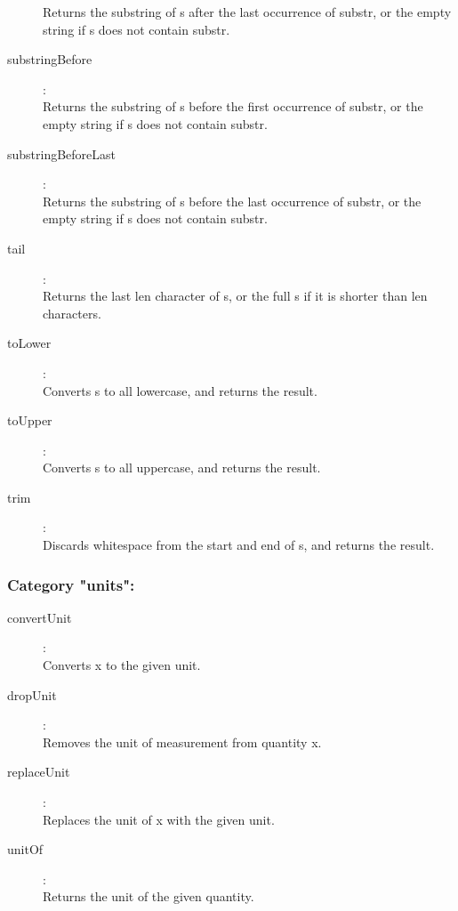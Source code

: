 \begin{description}
    Returns the substring of s after the last occurrence of substr, or the empty string if s does not contain substr.
\item[substringBefore]:  \\
    Returns the substring of s before the first occurrence of substr, or the empty string if s does not contain substr.
\item[substringBeforeLast]:  \\
    Returns the substring of s before the last occurrence of substr, or the empty string if s does not contain substr.
\item[tail]:  \\
    Returns the last len character of s, or the full s if it is shorter than len characters.
\item[toLower]:  \\
    Converts s to all lowercase, and returns the result.
\item[toUpper]:  \\
    Converts s to all uppercase, and returns the result.
\item[trim]:  \\
    Discards whitespace from the start and end of s, and returns the result.

\end{description}

\subsubsection{Category "units":}

\begin{description}
\item[convertUnit]:  \\
    Converts x to the given unit.
\item[dropUnit]:  \\
    Removes the unit of measurement from quantity x.
\item[replaceUnit]:  \\
    Replaces the unit of x with the given unit.
\item[unitOf]:  \\
    Returns the unit of the given quantity.
\end{description}

